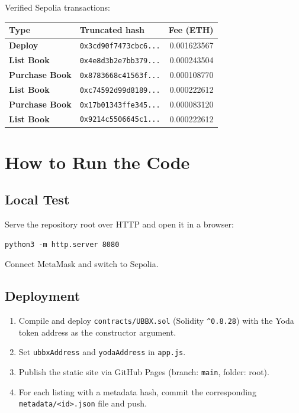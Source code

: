 \documentclass[11pt,letterpaper]{article}
\begin{document}
Verified Sepolia transactions:

\begin{center}
\begin{tabular}{@{} >{\bfseries}l l r @{}}
\toprule
Type & Truncated hash & Fee (ETH) \\
\midrule
Deploy        & \texttt{0x3cd90f7473cbc6...} & 0.001623567 \\
List Book     & \texttt{0x4e8d3b2e7bb379...} & 0.000243504 \\
Purchase Book & \texttt{0x8783668c41563f...} & 0.000108770 \\
List Book     & \texttt{0xc74592d99d8189...} & 0.000222612 \\
Purchase Book & \texttt{0x17b01343ffe345...} & 0.000083120 \\
List Book     & \texttt{0x9214c5506645c1...} & 0.000222612 \\
\bottomrule
\end{tabular}
\end{center}

\section{How to Run the Code}

\subsection*{Local Test}

Serve the repository root over HTTP and open it in a browser:

\begin{verbatim}
python3 -m http.server 8080
\end{verbatim}

Connect MetaMask and switch to Sepolia.

\subsection*{Deployment}

\begin{enumerate}
  \item Compile and deploy \texttt{contracts/UBBX.sol} (Solidity \texttt{\^{}0.8.28})
        with the Yoda token address as the constructor argument.
  \item Set \texttt{ubbxAddress} and \texttt{yodaAddress} in \texttt{app.js}.
  \item Publish the static site via GitHub Pages (branch: \texttt{main}, folder: root).
  \item For each listing with a metadata hash, commit the corresponding
        \texttt{metadata/<id>.json} file and push.
\end{enumerate}
\end{document}
